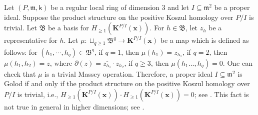 \documentclass[10pt,reqno]{amsart}
\theoremstyle{definition}
\theoremstyle{remark}
\numberwithin{equation}{section}
\newcommand{\kk}{\mathsf k}
\newcommand{\m}{\mathfrak m}
\numberwithin{equation}{section}
\begin{document}
Let $(P,\m,\kk)$ be a regular local ring of dimension 3 and let $I\subseteq \m^2$ be a proper ideal. Suppose the product structure on the positive Koszul homology over $P/I$ is trivial. Let $\mathfrak B$ be a basis for $H_{\geq 1}(\mathbf K^{P/I}(\textbf{x}))$. For $h\in \mathfrak B$, let $z_h$ be a representative for $h$. Let $\mu:\sqcup_{q\geq 1} \mathfrak B^q\xrightarrow[]{} \mathbf{K}^{P/I}(\textbf{x})$ be a map which is defined as follows: for $(h_1,\cdots,h_q)\in \mathfrak B^q$, if $q=1$, then $\mu(h_1)=z_{h_1}$, if $q=2$, then $\mu(h_1,h_2)= z$, where $\partial(z)=\overline{z_{h_1}}\cdot z_{h_2}$, if $q\geq 3$, then $\mu(h_1\ldots,h_q)=0$. One can check that $\mu$ is a trivial Massey operation. 
Therefore, a proper ideal $I\subseteq \m^2$ is Golod if and only if the product structure on the positive Koszul homology over $P/I$ is trivial, i.e., $H_{\geq 1}(\mathbf K^{P/I}(\textbf{x}))\cdot H_{\geq 1}(\mathbf K^{P/I}(\textbf{x}))=0$; see \cite{golod1962homologies}. This fact is not true in general in higher dimensions; see \cite[Theorem 3.1]{katthan2017non}.


\end{document}
